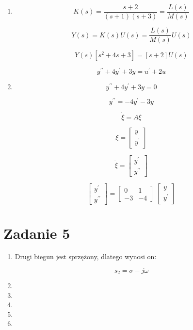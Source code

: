 \documentclass{article}
\begin{document}
\begin{enumerate}
    \item[a)] 
    $$ K(s) =  \frac{s+2}{(s+1)(s+3)} = \frac{L(s)}{M(s)} $$

    $$ Y(s) = K(s)U(s) = \frac{L(s)}{M(s)}U(s) $$

    $$Y(s)\left[s^{2}+4s+3\right]=[s+2]U(s)$$

    $$ y^{\prime\prime}+4y^{\prime}+3y=u^{\prime}+2u $$ 


    \item[b)] 

    $$ y^{\prime\prime}+4y^{\prime}+3y = 0 $$

    $$ y^{\prime\prime} = -4y^{\prime} - 3y $$

    $$ \dot{\xi} = A\xi$$

    $$ \xi = \begin{bmatrix}
        y \\
        y^{\prime}
        \end{bmatrix} $$

    $$ \dot{\xi} =  \begin{bmatrix}
        y^{\prime} \\
        y^{\prime\prime}
        \end{bmatrix}$$


    $$ \begin{bmatrix}
        y^{\prime} \\
        y^{\prime\prime}
        \end{bmatrix} = \begin{bmatrix}
            0 & 1\\
            -3 & -4
            \end{bmatrix}
        \;
        \begin{bmatrix}
            y \\
            y^{\prime}
            \end{bmatrix}   
             $$
    
\end{enumerate}

\newpage

\section*{Zadanie 5}

\begin{enumerate}
    \item[$a)$] Drugi biegun jest sprzężony, dlatego wynosi on: 
    
    
    $$s_{2}=\sigma - j\omega$$

    \item[$b)$] 


    \item[$\alpha\)$] 
     

    \item[$\beta\)$]  
     

    \item[$\gamma\)$] 


    \item[$\delta\)$] 


\end{enumerate}
\end{document}
